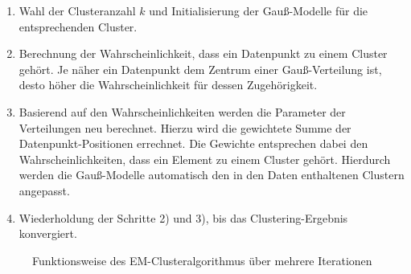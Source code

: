 \begin{enumerate}
    \item Wahl der Clusteranzahl $k$ und Initialisierung der Gauß-Modelle für die entsprechenden Cluster.
    \item Berechnung der Wahrscheinlichkeit, dass ein Datenpunkt zu einem Cluster gehört. Je näher
              ein Datenpunkt dem Zentrum einer Gauß-Verteilung ist, desto höher die Wahrscheinlichkeit für dessen Zugehörigkeit.
    \item Basierend auf den Wahrscheinlichkeiten werden die Parameter der Verteilungen neu berechnet.
              Hierzu wird die gewichtete Summe der Datenpunkt-Positionen errechnet. Die Gewichte entsprechen dabei
              den Wahrscheinlichkeiten, dass ein Element zu einem Cluster gehört. Hierdurch werden die Gauß-Modelle automatisch
              den in den Daten enthaltenen Clustern angepasst.
    \item Wiederholdung der Schritte 2) und 3), bis das Clustering-Ergebnis konvergiert.
\end{enumerate}

\begin{figure}[H]
    \centering
    \caption[Funktionsweise des EM-Clusteralgorithmus]{Funktionsweise des EM-Clusteralgorithmus über mehrere Iterationen \cite[]{GeorgeSeif2018}}
    \label{fig:grund_em_clustering}
\end{figure}

